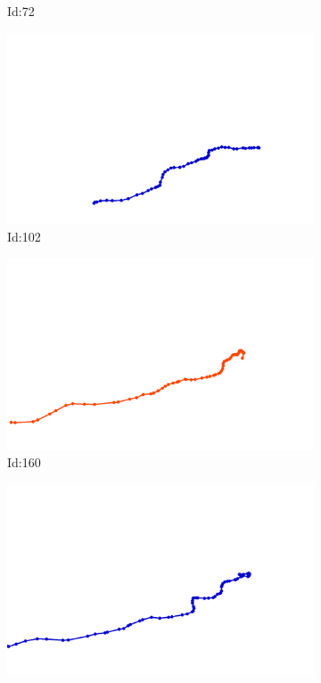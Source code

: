 \documentclass[12pt,twoside]{report}
\begin{document}
\begin{figure}
\begin{subfigure}[b]{0.20\textwidth}
\caption{Id:72}
\end{subfigure}
\begin{subfigure}[b]{0.20\textwidth}
\centering
\includegraphics[width=\textwidth]{../trajectories/102.png}
\caption{Id:102}
\end{subfigure}
\begin{subfigure}[b]{0.20\textwidth}
\centering
\includegraphics[width=\textwidth]{../trajectories/160.png}
\caption{Id:160}
\end{subfigure}
\begin{subfigure}[b]{0.20\textwidth}
\centering
\includegraphics[width=\textwidth]{../trajectories/200.png}

\end{subfigure}
\end{figure}
\end{document}
